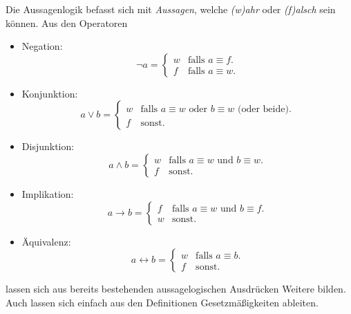 \documentclass{scrreprt}
\begin{document}
	Die Aussagenlogik befasst sich mit \emph{Aussagen}, welche \emph{(w)ahr} oder \emph{(f)alsch} sein können. Aus den Operatoren 
	\begin{itemize}
		\item
			Negation:
			\begin{equation*}
				\neg a =
					\begin{cases}
						w & \text{falls $a \equiv f$}.\\
						f & \text{falls $a \equiv w$}.
					\end{cases}
			\end{equation*}
		\item
			Konjunktion:
			\begin{equation*}
				a \lor b =
					\begin{cases}
						w & \text{falls $a \equiv w$ oder $b \equiv w$ (oder beide)}.\\
						f & \text{sonst}.
					\end{cases}
			\end{equation*}
		\item
			Disjunktion:
			\begin{equation*}
				a \land b =
					\begin{cases}
						w & \text{falls $a \equiv w$ und $b \equiv w$}.\\
						f & \text{sonst}.
					\end{cases}
			\end{equation*}
		\item
			Implikation:
			\begin{equation*}
				a \rightarrow b =
					\begin{cases}
						f & \text{falls $a \equiv w$ und $b \equiv f$}.\\
						w & \text{sonst}.
					\end{cases}
			\end{equation*}
		\item
			Äquivalenz:
			\begin{equation*}
				a \leftrightarrow b =
					\begin{cases}
						w & \text{falls $a \equiv b$}.\\
						f & \text{sonst}.
					\end{cases}
			\end{equation*}
	\end{itemize}
	lassen sich aus bereits bestehenden aussagelogischen Ausdrücken Weitere bilden. Auch lassen sich einfach aus den Definitionen Gesetzmäßigkeiten ableiten.
\end{document}

